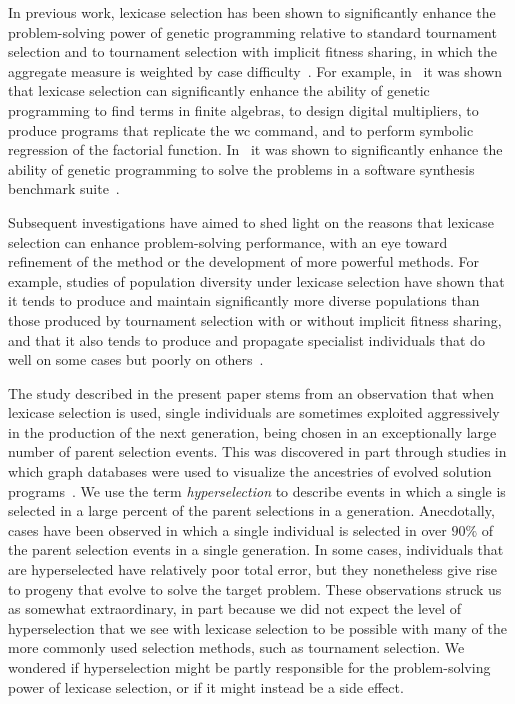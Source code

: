 \documentclass{sig-alternate}
\begin{document}
In previous work, lexicase selection has been shown to significantly enhance the problem-solving power of genetic programming relative to standard tournament selection and to tournament selection with implicit fitness sharing, in which the aggregate measure is weighted by case difficulty~\cite{McKay:2000:GECCO}. For example, in~\cite{Helmuth:2014:ieeeTEC} it was shown that lexicase selection can significantly enhance the ability of genetic programming to find terms in finite algebras, to design digital multipliers, to produce programs that replicate the {\ttfamily wc} command, and to perform symbolic regression of the factorial function. In~\cite{Helmuth:2015:dissertation} it was shown to significantly enhance the ability of genetic programming to solve the problems in a software synthesis benchmark suite~\cite{Helmuth:2015:GECCO}.

Subsequent investigations have aimed to shed light on the reasons that lexicase selection can enhance problem-solving performance, with an eye toward refinement of the method or the development of more powerful methods. For example, studies of population diversity under lexicase selection have shown that it tends to produce and maintain significantly more diverse populations than those produced by tournament selection with or without implicit fitness sharing, and that it also tends to produce and propagate specialist individuals that do well on some cases but poorly on others~\cite{Helmuth:2015:GPTP,Helmuth:2015:dissertation}.

The study described in the present paper stems from an observation that when lexicase selection is used, single individuals are sometimes exploited aggressively in the production of the next generation, being chosen in an exceptionally large number of parent selection events. This was discovered in part through studies in which graph databases were used to visualize the ancestries of evolved solution programs~\cite{McPhee:2015:GPTP}. We use the term \textit{hyperselection} to describe events in which a single is selected in a large percent of the parent selections in a generation. Anecdotally, cases have been observed in which a single individual is selected in over $90\%$ of the parent selection events in a single generation. In some cases, individuals that are hyperselected have relatively poor total error, but they nonetheless give rise to progeny that evolve to solve the target problem. These observations struck us as somewhat extraordinary, in part because we did not expect the level of hyperselection that we see with lexicase selection to be possible with many of the more commonly used selection methods, such as tournament selection. We wondered if hyperselection might be partly responsible for the problem-solving power of lexicase selection, or if it might instead be a side effect.
\end{document}

